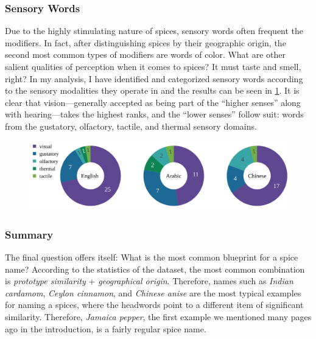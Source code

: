 \subsubsection{Sensory Words}

Due to the highly stimulating nature of spices, sensory words often frequent the modifiers. In fact, after distinguishing spices by their geographic origin, the second most common types of modifiers are words of color. What are other salient qualities of perception when it comes to spices? It must taste and smell, right? In my analysis, I have identified and categorized sensory words according to the sensory modalities they operate in and the results can be seen in \cref{fig:sensory_tripie}. It is clear that vision---generally accepted as being part of the ``higher senses'' along with hearing---takes the highest ranks, and the ``lower senses'' follow suit: words from the gustatory, olfactory, tactile, and thermal sensory domains. 



\begin{figure}[ht!]
  \includegraphics[width=\linewidth]{imgs/plots/sensory_tripie.pdf}
  \caption{}
  \label{fig:sensory_tripie}
\end{figure}




\subsubsection{Summary}

The final question offers itself: What is the most common blueprint for a spice name? According to the statistics of the dataset, the most common combination is \textit{prototype similarity} + \textit{geographical origin}. Therefore, names such as \textit{Indian cardamom}, \textit{Ceylon cinnamon}, and \textit{Chinese anise} are the most typical examples for naming a spices, where the headwords point to a different item of significant similarity. Therefore, \textit{Jamaica pepper}, the first example we mentioned many pages ago in the introduction, is a fairly regular spice name.





